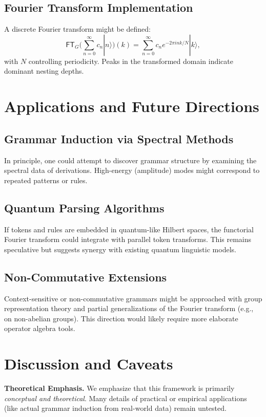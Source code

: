 \documentclass[11pt]{article}
\begin{document}
\subsection{Fourier Transform Implementation}
A discrete Fourier transform might be defined:
\[
\mathsf{FT}_G \Big( \sum_{n=0}^\infty c_n |n\rangle \Big)(k) = \sum_{n=0}^\infty c_n e^{-2\pi i n k / N} |k\rangle,
\]
with \(N\) controlling periodicity. Peaks in the transformed domain indicate dominant nesting depths.

\section{Applications and Future Directions}
\subsection{Grammar Induction via Spectral Methods}
In principle, one could attempt to discover grammar structure by examining the spectral data of derivations. High-energy (amplitude) modes might correspond to repeated patterns or rules.

\subsection{Quantum Parsing Algorithms}
If tokens and rules are embedded in quantum-like Hilbert spaces, the functorial Fourier transform could integrate with parallel token transforms. This remains speculative but suggests synergy with existing quantum linguistic models.

\subsection{Non-Commutative Extensions}
Context-sensitive or non-commutative grammars might be approached with group representation theory and partial generalizations of the Fourier transform (e.g., on non-abelian groups). This direction would likely require more elaborate operator algebra tools.

\section{Discussion and Caveats}
\noindent\textbf{Theoretical Emphasis.} We emphasize that this framework is primarily \emph{conceptual and theoretical}. Many details of practical or empirical applications (like actual grammar induction from real-world data) remain untested.
\end{document}
